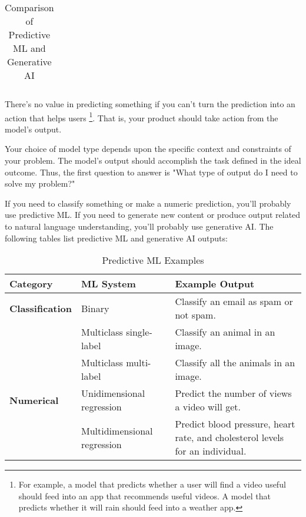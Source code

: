 \begin{table}[h!]
\begin{tabular}{|l|l|l|l|}
    \end{tabular}
    \caption{Comparison of Predictive ML and Generative AI}
\end{table}

There's no value in predicting something if you can't turn the
prediction into an action that helps users
\footnote{
    For example, a model that predicts whether a user will find
    a video useful should feed into an app that recommends
    useful videos. A model that predicts whether it will rain
    should feed into a weather app.
}.
That is, your product should take action from the model's output.

Your choice of model type depends upon the specific context and
constraints of your problem. The model's output should accomplish
the task defined in the ideal outcome. Thus, the first question
to answer is "What type of output do I need to solve my problem?"

If you need to classify something or make a numeric prediction,
you'll probably use predictive ML. If you need to generate new
content or produce output related to natural language
understanding, you'll probably use generative AI. The following
tables list predictive ML and generative AI outputs:

\begin{table}[h!]
    \centering
    \begin{tabular}{|l|l|l|}
    \hline
    \textbf{Category} & \textbf{ML System} & \textbf{Example Output} \\ \hline
    \textbf{Classification} & Binary & Classify an email as spam or not spam. \\ \hline
    \textbf{} & Multiclass single-label & Classify an animal in an image. \\ \hline
    \textbf{} & Multiclass multi-label & Classify all the animals in an image. \\ \hline
    \textbf{Numerical} & Unidimensional regression & Predict the number of views a video will get. \\ \hline
    \textbf{} & Multidimensional regression & Predict blood pressure, heart rate, and cholesterol levels for an individual. \\ \hline
    \end{tabular}
    \caption{Predictive ML Examples}
\end{table}

